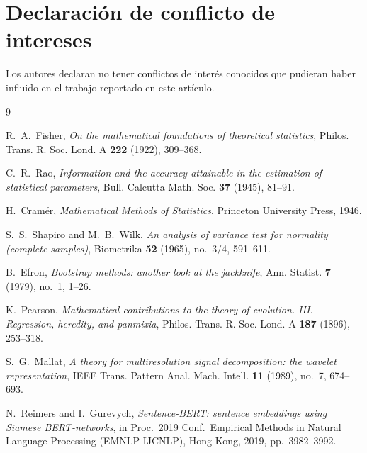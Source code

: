\documentclass[11pt,a4paper,oneside]{article}
\theoremstyle{definition}
\begin{document}
\section*{Declaración de conflicto de intereses}

Los autores declaran no tener conflictos de interés conocidos que pudieran haber influido en el
trabajo reportado en este artículo.

\begin{thebibliography}{9}

 R.~A.~Fisher, \emph{On the mathematical foundations of theoretical
statistics}, Philos. Trans. R. Soc. Lond. A \textbf{222} (1922), 309--368.

 C.~R.~Rao, \emph{Information and the accuracy attainable in the estimation of
statistical parameters}, Bull. Calcutta Math. Soc. \textbf{37} (1945), 81--91.

 H.~Cram\'er, \emph{Mathematical Methods of Statistics}, Princeton University
Press, 1946.

 S.~S.~Shapiro and M.~B.~Wilk, \emph{An analysis of variance test for
normality (complete samples)}, Biometrika \textbf{52} (1965), no.~3/4, 591--611.

 B.~Efron, \emph{Bootstrap methods: another look at the jackknife}, Ann.
Statist. \textbf{7} (1979), no.~1, 1--26.

 K.~Pearson, \emph{Mathematical contributions to the theory of evolution.
III. Regression, heredity, and panmixia}, Philos. Trans. R. Soc. Lond. A \textbf{187} (1896),
253--318.

 S.~G.~Mallat, \emph{A theory for multiresolution signal decomposition: the
wavelet representation}, IEEE Trans. Pattern Anal. Mach. Intell. \textbf{11} (1989), no.~7,
674--693.

 N.~Reimers and I.~Gurevych, \emph{Sentence-BERT: sentence
embeddings using Siamese BERT-networks}, in Proc.\ 2019 Conf.\ Empirical Methods in Natural
Language Processing (EMNLP-IJCNLP), Hong Kong, 2019, pp.~3982--3992.

\end{thebibliography}
\end{document}
